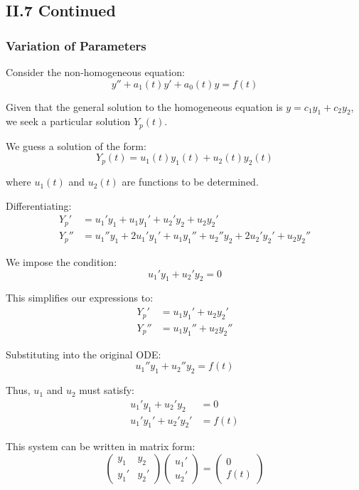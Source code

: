 \documentclass{article}
\begin{document}
\subsection*{II.7 Continued}

\subsubsection*{Variation of Parameters}

Consider the non-homogeneous equation:
\[
y'' + a_1(t)y' + a_0(t)y = f(t)
\]

Given that the general solution to the homogeneous equation is $y = c_1y_1 + c_2y_2$, we seek a particular solution $Y_p(t)$.

We guess a solution of the form:
\[
Y_p(t) = u_1(t)y_1(t) + u_2(t)y_2(t)
\]

where $u_1(t)$ and $u_2(t)$ are functions to be determined.

Differentiating:
\begin{align*}
Y_p' &= u_1'y_1 + u_1y_1' + u_2'y_2 + u_2y_2' \\
Y_p'' &= u_1''y_1 + 2u_1'y_1' + u_1y_1'' + u_2''y_2 + 2u_2'y_2' + u_2y_2''
\end{align*}

We impose the condition:
\[
u_1'y_1 + u_2'y_2 = 0
\]

This simplifies our expressions to:
\begin{align*}
Y_p' &= u_1y_1' + u_2y_2' \\
Y_p'' &= u_1y_1'' + u_2y_2''
\end{align*}

Substituting into the original ODE:
\[
u_1''y_1 + u_2''y_2 = f(t)
\]

Thus, $u_1$ and $u_2$ must satisfy:
\begin{align*}
u_1'y_1 + u_2'y_2 &= 0 \\
u_1'y_1' + u_2'y_2' &= f(t)
\end{align*}

This system can be written in matrix form:
\[
\begin{pmatrix}
y_1 & y_2 \\
y_1' & y_2'
\end{pmatrix}
\begin{pmatrix}
u_1' \\
u_2'
\end{pmatrix} =
\begin{pmatrix}
0 \\
f(t)
\end{pmatrix}
\]
\end{document}
